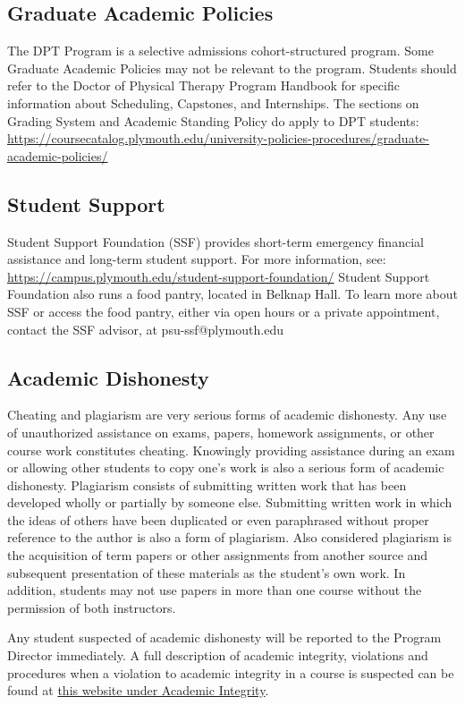 \documentclass[letterpaper]{inzane_syllabus} %
\begin{document}
\subsection{Graduate Academic Policies}
The DPT Program is a selective admissions cohort-structured program.  Some Graduate Academic Policies may not be relevant to the program.  Students should refer to the Doctor of Physical Therapy Program Handbook for specific information about Scheduling, Capstones, and Internships.   The sections on Grading System and Academic Standing Policy do apply to DPT students: \url{https://coursecatalog.plymouth.edu/university-policies-procedures/graduate-academic-policies/}

\subsection{Student Support}
\footnotesize{Student Support Foundation (SSF) provides short-term emergency financial assistance and long-term student support. For more information, see: \url{https://campus.plymouth.edu/student-support-foundation/}  Student Support Foundation also runs a food pantry, located in Belknap Hall. To learn more about SSF or access the food pantry, either via open hours or a private appointment, contact the SSF advisor, at psu-ssf@plymouth.edu }

\subsection{Academic Dishonesty}
\footnotesize{Cheating and plagiarism are very serious forms of academic dishonesty. Any use of unauthorized assistance on exams, papers, homework assignments, or other course work constitutes cheating. Knowingly providing assistance during an exam or allowing other students to copy one’s work is also a serious form of academic dishonesty. Plagiarism consists of submitting written work that has been developed wholly or partially by someone else. Submitting written work in which the ideas of others have been duplicated or even paraphrased without proper reference to the author is also a form of plagiarism. Also considered plagiarism is the acquisition of term papers or other assignments from another source and subsequent presentation of these materials as the student’s own work. In addition, students may not use papers in more than one course without the permission of both instructors. 
 
Any student suspected of academic dishonesty will be reported to the Program Director immediately. A full description of academic integrity, violations and procedures when a violation to academic integrity in a course is suspected can be found at \href{https://coursecatalog.plymouth.edu/university-policies-procedures/}{this website under Academic Integrity}.  
}
\newpage
\end{document}
